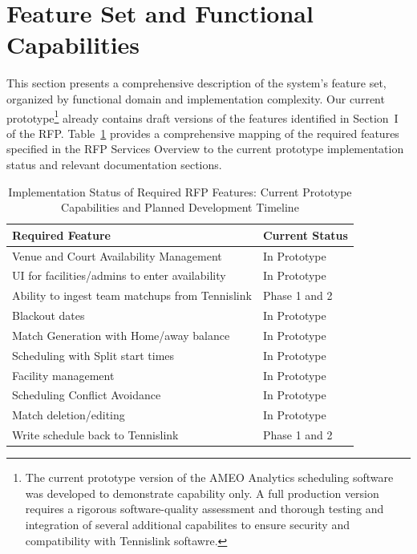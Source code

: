 \pagebreak

\section{Feature Set and Functional Capabilities}
\label{sec:feature-set}

This section presents a comprehensive description of the system's feature set, organized by functional domain and implementation complexity. Our current prototype\footnote{The current prototype version of the AMEO Analytics scheduling software was developed to demonstrate capability only. A full production version requires a rigorous software-quality assessment and thorough testing and integration of several additional capabilites to ensure security and compatibility with Tennislink softawre.} already contains draft versions of the features identified in Section~I of the RFP. Table~\ref{tab:rfp-compliance} provides a comprehensive mapping of the required features specified in the RFP Services Overview to the current prototype implementation status and relevant documentation sections. 

\begin{table}[htbp]
\centering
\caption{Implementation Status of Required RFP Features: Current Prototype Capabilities and Planned Development Timeline }
\label{tab:rfp-compliance}
\small
\begin{tabular}{|p{}|p{}|}
\hline
\textbf{Required Feature} & \textbf{Current Status} \\
\hline
Venue and Court Availability Management & In Prototype \\
\hline
UI for facilities/admins to enter availability & In Prototype \\
\hline
Ability to ingest team matchups from Tennislink & Phase 1 and 2 \\
\hline
Blackout dates & In Prototype \\
\hline
Match Generation with Home/away balance & In Prototype \\
\hline
Scheduling with Split start times & In Prototype \\
\hline
Facility management & In Prototype \\
\hline
Scheduling Conflict Avoidance & In Prototype \\
\hline
Match deletion/editing & In Prototype \\
\hline
Write schedule back to Tennislink & Phase 1 and 2 \\
\hline
\end{tabular}
\end{table}


